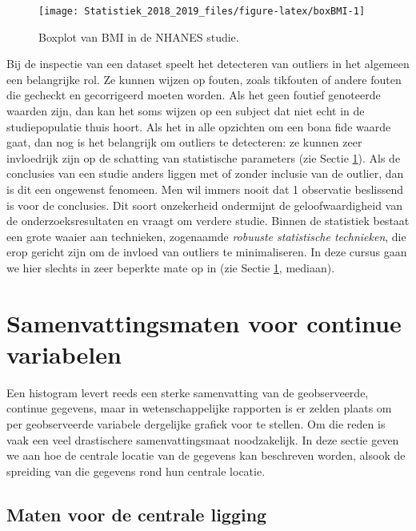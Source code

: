 \documentclass[12pt,dutch,coursenotes]{book}
\theoremstyle{definition}
\theoremstyle{definition}
\theoremstyle{definition}
\theoremstyle{remark}
\begin{document}
\begin{figure}

{\centering \texttt{[image: Statistiek\_2018\_2019\_files/figure-latex/boxBMI-1]} 

}

\caption{Boxplot van BMI in de NHANES studie.}\label{fig:boxBMI}
\end{figure}

Bij de inspectie van een dataset speelt het detecteren van outliers in
het algemeen een belangrijke rol. Ze kunnen wijzen op fouten, zoals
tikfouten of andere fouten die gecheckt en gecorrigeerd moeten worden.
Als het geen foutief genoteerde waarden zijn, dan kan het soms wijzen op
een subject dat niet echt in de studiepopulatie thuis hoort. Als het in
alle opzichten om een bona fide waarde gaat, dan nog is het belangrijk
om outliers te detecteren: ze kunnen zeer invloedrijk zijn op de
schatting van statistische parameters (zie Sectie \ref{sec:summarize}).
Als de conclusies van een studie anders liggen met of zonder inclusie
van de outlier, dan is dit een ongewenst fenomeen. Men wil immers nooit
dat 1 observatie beslissend is voor de conclusies. Dit soort onzekerheid
ondermijnt de geloofwaardigheid van de onderzoeksresultaten en vraagt om
verdere studie. Binnen de statistiek bestaat een grote waaier aan
technieken, zogenaamde \emph{robuuste statistische technieken}, die erop
gericht zijn om de invloed van outliers te minimaliseren. In deze cursus
gaan we hier slechts in zeer beperkte mate op in (zie Sectie
\ref{sec:summarize}, mediaan).

\section{Samenvattingsmaten voor continue
variabelen}\label{sec:summarize}

Een histogram levert reeds een sterke samenvatting van de geobserveerde,
continue gegevens, maar in wetenschappelijke rapporten is er zelden
plaats om per geobserveerde variabele dergelijke grafiek voor te
stellen. Om die reden is vaak een veel drastischere samenvattingsmaat
noodzakelijk. In deze sectie geven we aan hoe de centrale locatie van de
gegevens kan beschreven worden, alsook de spreiding van die gegevens
rond hun centrale locatie.

\subsection{Maten voor de centrale
ligging}\label{maten-voor-de-centrale-ligging}
\end{document}

